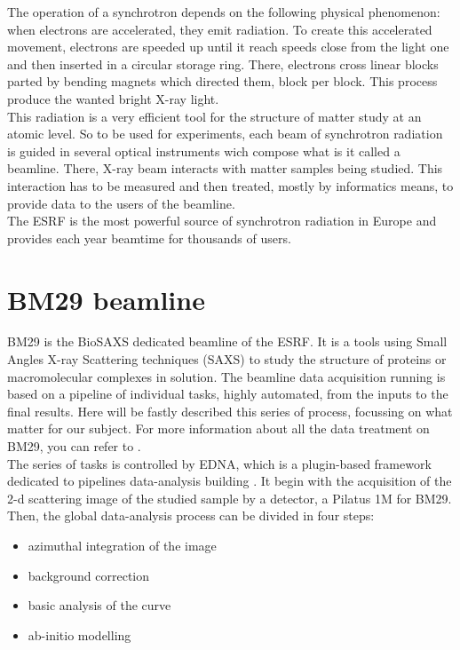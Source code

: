 \documentclass[a4paper, 11pt]{report}
\begin{document}
The operation of a synchrotron depends on the following physical 
phenomenon: when electrons are accelerated, they emit radiation. 
To create this accelerated movement, electrons are speeded up until it 
reach speeds close from the light one and then inserted in a circular 
storage ring. 
There, electrons cross linear blocks parted by bending magnets which 
directed them, block per block. 
This process produce the wanted bright X-ray light.\\

This radiation is a very efficient tool for the structure of matter 
study at an atomic level. 
So to be used for experiments, each beam of synchrotron radiation is 
guided in several optical instruments wich compose what is it called a 
beamline. 
There, X-ray beam interacts with matter samples being studied. 
This interaction has to be measured and then treated, mostly by 
informatics means, to provide data to the users of the beamline.\\

The ESRF is the most powerful source of synchrotron radiation in 
Europe and provides each year beamtime for thousands of users.


\section{BM29 beamline}%

BM29 is the BioSAXS dedicated beamline of the ESRF. 
It is a tools using Small Angles X-ray Scattering techniques (SAXS) to 
study the structure of proteins or macromolecular complexes in 
solution. 
The beamline data acquisition running is based on a pipeline of 
individual tasks, highly automated, from the inputs to the final 
results. 
Here will be fastly described this series of process, focussing on 
what matter for our subject.
For more information about all the data treatment on BM29, you can 
refer to .\\ %

The series of tasks is controlled by EDNA, which is a plugin-based 
framework dedicated to pipelines data-analysis building \cite{edna}. 
It begin with the acquisition of the 2-d scattering image of the 
studied sample by a detector, a Pilatus 1M for BM29. 
Then, the global data-analysis process can be divided in four steps: 
\begin{itemize}
 \item azimuthal integration of the image
 \item background correction
 \item basic analysis of the curve
 \item ab-initio modelling
\end{itemize}
\end{document}
